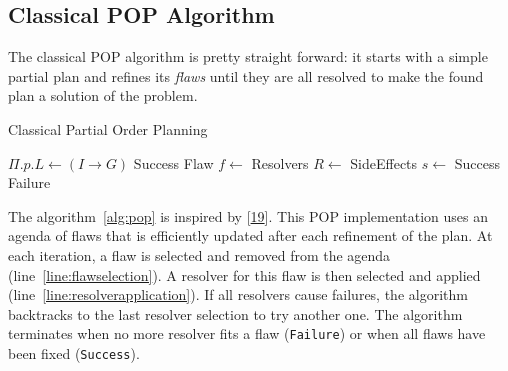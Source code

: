 \subsection{Classical POP Algorithm}\label{classical-pop-algorithm}

The classical POP algorithm is pretty straight forward: it starts with a
simple partial plan and refines its \emph{flaws} until they are all
resolved to make the found plan a solution of the problem.

\begin{algorithm}\caption{Classical Partial Order Planning}\label{alg:pop}\begin{algorithmic}[1]

\footnotesize
{}
\State {}
 
\State \(\Pi.p.L \gets (I \rightarrow G)\) \label{line:emptygoal} \EndIf
  \State \Return Success
 \EndIf
 \State Flaw \(f \gets\)  \label{line:flawselection}
 \State Resolvers \(R \gets\)
 
\State {} \label{line:resolverapplication}
 \State SideEffects \(s \gets\)
 \label{line:sideeffectapplication}
\State {} 
 \State \Return Success \EndIf
 \State {}
\State {}
 \EndFor
 \State \Return Failure
\EndFunction

\end{algorithmic}\end{algorithm}

The algorithm~\ref{alg:pop} is inspired by
{[}\protect\hyperlink{ref-ghallabux5fautomatedux5f2004}{19}{]}. This POP
implementation uses an agenda of flaws that is efficiently updated after
each refinement of the plan. At each iteration, a flaw is selected and
removed from the agenda (line~\ref{line:flawselection}). A resolver for
this flaw is then selected and applied
(line~\ref{line:resolverapplication}). If all resolvers cause failures,
the algorithm backtracks to the last resolver selection to try another
one. The algorithm terminates when no more resolver fits a flaw
(\lstinline!Failure!) or when all flaws have been fixed
(\lstinline!Success!).

